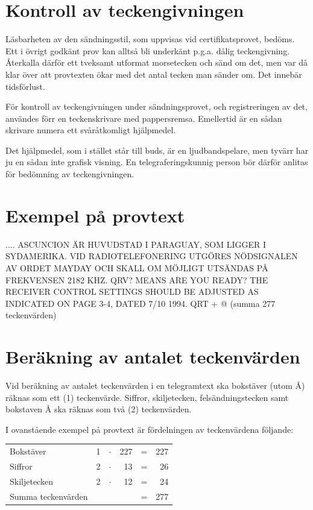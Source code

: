 \section{Kontroll av teckengivningen}

Läsbarheten av den sändningsstil, som uppvisas vid certifikatsprovet,
bedöms. Ett i övrigt godkänt prov kan alltså bli underkänt p.g.a. dålig
teckengivning. Återkalla därför ett tveksamt utformat morsetecken och sänd om
det, men var då klar över att provtexten ökar med det antal tecken man sänder
om. Det innebär tidsförlust.

För kontroll av teckengivningen under sändningsprovet, och registreringen av
det, användes förr en teckenskrivare med pappersremsa. Emellertid är en sådan
skrivare numera ett svåråtkomligt hjälpmedel.

Det hjälpmedel, som i stället står till buds, är en ljudbandspelare, men tyvärr
har ju en sådan inte grafisk visning. En telegraferingskunnig person bör därför
anlitas för bedömning av teckengivningen.

\section{Exempel på provtext}

.... ASCUNCION ÄR HUVUDSTAD I PARAGUAY, SOM LIGGER I SYDAMERIKA.  VID
RADIOTELEFONERING UTGÖRES NÖDSIGNALEN AV ORDET MAYDAY OCH SKALL OM MÖJLIGT
UTSÄNDAS PÅ FREKVENSEN 2182 KHZ. QRV? MEANS ARE YOU READY? THE RECEIVER CONTROL
SETTINGS SHOULD BE ADJUSTED AS INDICATED ON PAGE 3-4, DATED 7/10 1994. QRT + @
(summa 277 teckenvärden)

\section{Beräkning av antalet teckenvärden}

Vid beräkning av antalet teckenvärden i en telegramtext ska bokstäver (utom Å)
räknas som ett (1) teckenvärde. Siffror, skiljetecken, felsändningstecken samt
bokstaven Å ska räknas som två (2) teckenvärden.

I ovanstående exempel på provtext är fördelningen av teckenvärdena följande:

\begin{tabular}{lrcrcr}
Bokstäver          & 1 & $\cdot$ & 227 & = & 227 \\
Siffror            & 2 & $\cdot$ & 13  & = & 26  \\
Skiljetecken       & 2 & $\cdot$ & 12  & = & 24  \\
Summa teckenvärden &   &         &     & = & 277
\end{tabular}

